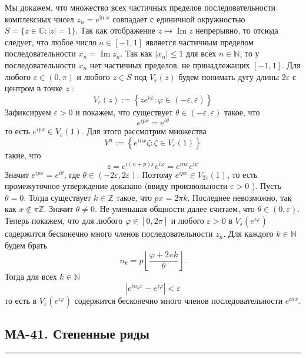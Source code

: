 \documentclass[a4paper,12pt]{article} %
\newcommand{\HRule}{\rule{\linewidth}{0.5mm}}
\begin{document}
Мы докажем, что множество всех частичных пределов последовательности комплексных чисел $z_n=e^{\text {in } x}$ совпадает с единичной окружностью $S=\{z \in \mathbb{C}:|z|=1\}$. Так как отображение $z \mapsto \operatorname{Im} z$ непрерывно, то отсюда следует, что любое число $a \in[-1,1]$ является частичным пределом последовательности $x_n=\operatorname{Im} z_n$. 
Так как $\left|x_n\right| \leq 1$ для всех $n \in \mathbb{N}$, то у последовательности $x_n$ нет частичных пределов, не принадлежащих $[-1,1]$.
Для любого $\varepsilon \in(0, \pi)$ и любого $z \in S$ под $V_{\varepsilon}(z)$ будем понимать дугу длины $2 \varepsilon$ с центром в точке $z$ :
$$
V_{\varepsilon}(z):=\left\{z e^{i \varphi}: \varphi \in(-\varepsilon, \varepsilon)\right\}
$$
Зафиксируем $\varepsilon>0$ и покажем, что существует $\theta \in(-\varepsilon, \varepsilon)$ такое, что
$$
e^{i p x}=e^{i \theta}
$$
то есть $e^{i p x} \in V_{\varepsilon}(1)$. Для этого рассмотрим множества
$$
V^n:=\left\{e^{i n x} \zeta: \zeta \in V_{\varepsilon}(1)\right\}
$$
такие, что
$$
z=e^{i(n+p) x} e^{i \varphi}=e^{i n x} e^{i \psi}
$$
Значит $e^{i p x}=e^{i \theta}$, где $\theta \in(-2 \varepsilon, 2 \varepsilon)$. Поэтому $e^{i p x} \in V_{2 \varepsilon}(1)$, то есть промежуточное утверждение доказано (ввиду произвольности $\varepsilon>0$ ).
Пусть $\theta=0$. Тогда существует $k \in \mathbb{Z}$ такое, что $p x=2 \pi k$. Последнее невозможно, так как $x \notin \pi \mathbb{Z}$. Значит $\theta \neq 0$. Не уменьшая общности далее считаем, что $\theta \in(0, \varepsilon)$.
Теперь покажем, что для любого $\varphi \in[0,2 \pi]$ и любого $\varepsilon>0$ в $V_{\varepsilon}\left(e^{i \varphi}\right)$ содержится бесконечно много членов последовательности $z_n$. Для каждого $k \in \mathbb{N}$ будем брать
$$
n_k=p\left\lfloor\frac{\varphi+2 \pi k}{\theta}\right\rfloor .
$$
Тогда для всех $k \in \mathbb{N}$
$$
\left|e^{i n_k x}-e^{i \varphi}\right|<\varepsilon
$$
то есть в $V_{\varepsilon}\left(e^{i \varphi}\right)$ содержится бесконечно много членов последовательности $e^{i n x}$.

\newpage

\begin{LARGE}
	\begin{center}
		\section{МА-41. Степенные ряды }
	\end{center}
\end{LARGE}
\HRule \\
\end{document}
